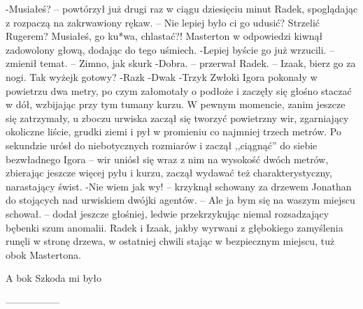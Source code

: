 \documentclass[../MAIN.tex]{subfiles}
\begin{document}
-Musiałeś? -- powtórzył już drugi raz w ciągu dziesięciu minut Radek, spoglądając z rozpaczą na zakrwawiony rękaw. -- Nie lepiej było ci go udusić? Strzelić Rugerem? Musiałeś, go ku*wa, chlastać?!
Masterton w odpowiedzi kiwnął zadowolony głową, dodając do tego uśmiech.
-Lepiej byście go już wrzucili. -- zmienił temat. -- Zimno, jak skur\3k
-Dobra. -- przerwał Radek. -- Izaak, bierz go za nogi. Ta\3k wyżej\3k gotowy?
-Raz\3k
-Dwa\3k
-Trzy\3k
Zwłoki Igora pokonały w powietrzu dwa metry, po czym załomotały o podłoże i zaczęły się głośno staczać w dół, wzbijając przy tym tumany kurzu. W pewnym momencie, zanim jeszcze się zatrzymały, u zboczu urwiska zaczął się tworzyć powietrzny wir, zgarniający okoliczne liście, grudki ziemi i pył w promieniu co najmniej trzech metrów. Po sekundzie urósł do niebotycznych rozmiarów i zaczął ,,ciągnąć'' do siebie bezwładnego Igora -- wir uniósł się wraz z nim na wysokość dwóch metrów, zbierając jeszcze więcej pyłu i kurzu, zaczął wydawać też charakterystyczny, narastający świst.
-Nie wiem jak wy! -- krzyknął schowany za drzewem Jonathan do stojących nad urwiskiem dwójki agentów. -- Ale ja bym się na waszym miejscu schował. -- dodał jeszcze głośniej, ledwie przekrzykując niemal rozsadzający bębenki szum anomalii. Radek i Izaak, jakby wyrwani z głębokiego zamyślenia runęli w stronę drzewa, w ostatniej chwili stając w bezpiecznym miejscu, tuż obok Mastertona.



A bo\3k Szkoda mi było


-----------------
\end{document}
